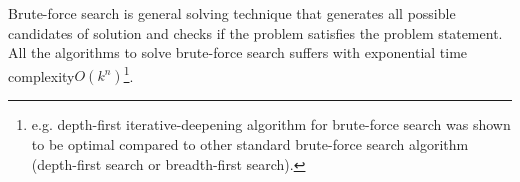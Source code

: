 Brute-force search is general solving technique that generates all possible candidates of solution and checks if the problem satisfies the problem statement. All the algorithms to solve brute-force search suffers with exponential time complexity$O(k^n)$\footnote{e.g. depth-first iterative-deepening algorithm for brute-force search was shown to be optimal compared to other standard brute-force search algorithm (depth-first search or breadth-first search)\cite{Korf1985,Pearl1987}.}.


